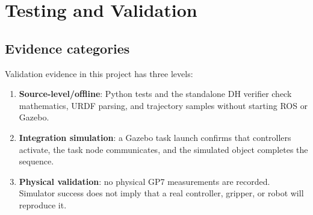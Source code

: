 \chapter{Testing and Validation}
\label{ch:validation}

\section{Evidence categories}
Validation evidence in this project has three levels:
\begin{enumerate}
 \item \textbf{Source-level/offline}: Python tests and the standalone DH
 verifier check mathematics, URDF parsing, and trajectory samples without
 starting ROS or Gazebo.
 \item \textbf{Integration simulation}: a Gazebo task launch confirms that
 controllers activate, the task node communicates, and the simulated object
 completes the sequence.
 \item \textbf{Physical validation}: no physical GP7 measurements are
 recorded. Simulator success does not imply that a real controller, gripper,
 or robot will reproduce it.
\end{enumerate}


